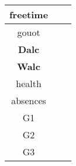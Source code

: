\begin{table}[h]
\begin{tabular}{|c|c|c|}
freetime   &      &    \\ \hline
gouot   &      &    \\ \hline
\textbf{Dalc}  &      &    \\ \hline
\textbf{Walc}   &      &    \\ \hline
health   &      &    \\ \hline
absences  &      &    \\ \hline
G1  &      &    \\ \hline
G2  &      &    \\ \hline
G3   &      &    \\ \hline
\end{tabular}
\end{table}